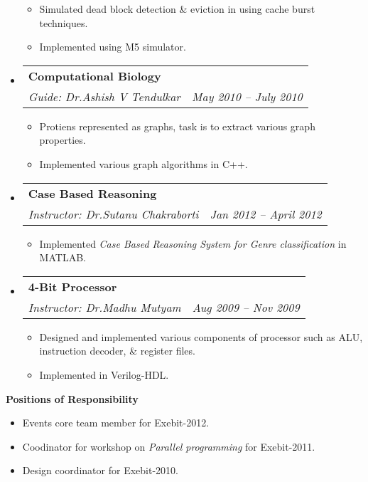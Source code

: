 \documentclass[letterpaper,11pt]{article}
\makeatletter
\newcommand{\resitem}[1]{\item #1 \vspace{-2pt}}
\newcommand{\resheading}[1]{{\large \colorbox{mygrey}{\begin{minipage}{\textwidth}{\textbf{#1 \vphantom{p\^{E}}}}\end{minipage}}}}
\newcommand{\ressubheading}[4]{
\begin{tabular*}{6.5in}{l@{\extracolsep{\fill}}r}
		\textbf{#1} & #2 \\
		\textit{#3} & \textit{#4} \\
\end{tabular*}\vspace{-6pt}}
\makeatother
\begin{document}
\begin{itemize}
			{ \footnotesize
			\begin{itemize}
				\resitem{Simulated dead block detection \& eviction in using cache burst techniques.}
				\resitem{Implemented using M5 simulator.}
			\end{itemize}
			}
		\item
			\ressubheading{{Computational Biology}}{}{Guide: Dr.Ashish V Tendulkar}{May 2010 -- July 2010}
			{ \footnotesize
			\begin{itemize}
				\resitem{Protiens represented as graphs, task is to extract various graph properties.}
				\resitem{Implemented various graph algorithms in C++.}
			\end{itemize}
			}
		\item
			\ressubheading{{Case Based Reasoning}}{}{Instructor: Dr.Sutanu Chakraborti}{Jan 2012 -- April 2012}
			{ \footnotesize
			\begin{itemize}
				\resitem{Implemented \emph{Case Based Reasoning System for Genre classification} in MATLAB.}
			\end{itemize}
			}
		\item
			\ressubheading{{4-Bit Processor}}{}{Instructor: Dr.Madhu Mutyam}{Aug 2009 -- Nov 2009}
			{ \footnotesize
			\begin{itemize}
				\resitem{Designed and implemented various components of processor such as ALU, instruction decoder, \& register files.}
				\resitem{Implemented in Verilog-HDL.}
			\end{itemize}
			}
	\end{itemize}  %

\resheading{Positions of Responsibility}
    \begin{itemize}
        \item \footnotesize Events core team member for Exebit-2012.
        \item \footnotesize Coodinator for workshop on \emph{Parallel programming} for Exebit-2011.
        \item \footnotesize Design coordinator for Exebit-2010.
    \end{itemize}
\end{document}
